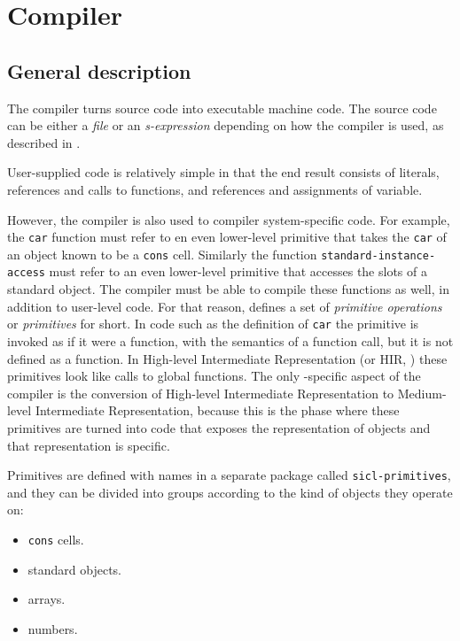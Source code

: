 \chapter{Compiler}
\label{chap-compiler}

\section{General description}

The \sysname{} compiler turns source code into executable machine
code.  The source code can be either a \emph{file} or an
\emph{s-expression} depending on how the compiler is used, as
described in .

User-supplied code is relatively simple in that the end result
consists of literals, references and calls to functions, and
references and assignments of variable.

However, the compiler is also used to compiler system-specific code.
For example, the \texttt{car} function must refer to en even
lower-level primitive that takes the \texttt{car} of an object known
to be a \texttt{cons} cell.  Similarly the function
\texttt{standard-instance-access} must refer to an even lower-level
primitive that accesses the slots of a standard object.  The compiler
must be able to compile these functions as well, in addition to
user-level code.  For that reason, \sysname{} defines a set of
\emph{primitive operations} or \emph{primitives} for short.  In code
such as the definition of \texttt{car} the primitive is invoked as if
it were a function, with the semantics of a function call, but it is
not defined as a function.  In High-level Intermediate Representation
(or HIR, ) these primitives
look like calls to global functions.  The only \sysname{}-specific
aspect of the compiler is the conversion of High-level Intermediate
Representation to Medium-level Intermediate Representation, because
this is the phase where these primitives are turned into code that
exposes the representation of objects and that representation is
\sysname{} specific.

Primitives are defined with names in a separate package called
\texttt{sicl-primitives}, and they can be divided into groups
according to the kind of objects they operate on:

\begin{itemize}
\item \texttt{cons} cells.
\item standard objects.
\item arrays.
\item numbers.
\end{itemize}

